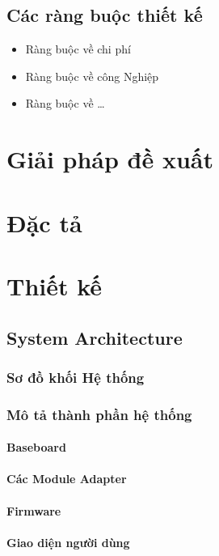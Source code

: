         \subsection{Các ràng buộc thiết kế}
            \begin{itemize}
                \item Ràng buộc về chi phí
                \item Ràng buộc về công Nghiệp
                \item Ràng buộc về \dots
            \end{itemize}


    \section{Giải pháp đề xuất}
    \section{Đặc tả}
    \section{Thiết kế}
        \subsection{System Architecture}
            \subsubsection{Sơ đồ khối Hệ thống}
            \subsubsection{Mô tả thành phần hệ thống}
                \paragraph{Baseboard}\par
                \paragraph{Các Module Adapter}\par
                \paragraph{Firmware}\par
                \paragraph{Giao diện người dùng}\par
